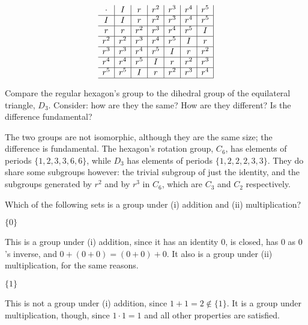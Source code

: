 \documentclass[../key.tex]{subfiles}
\begin{document}
$$\begin{array}{c|c|c|c|c|c|c|}
\cdot & I & r & r^2 & r^3 & r^4 & r^5 \\ \hline
I & I & r & r^2 & r^3 & r^4 & r^5 \\ \hline
r & r & r^2 & r^3 & r^4 & r^5 & I \\ \hline
r^2 & r^2 & r^3 & r^4 & r^5 & I & r \\ \hline
r^3 & r^3 & r^4 & r^5 & I & r & r^2 \\ \hline
r^4 & r^4 & r^5 & I & r & r^2 & r^3 \\ \hline
r^5 & r^5 & I & r & r^2 & r^3 & r^4 \\ \hline
\end{array}$$

\begin{inner_problem}
\item Compare the regular hexagon's group to the dihedral group of the equilateral triangle, $D_3$. Consider: how are they the same? How are they different? Is the difference fundamental?
\end{inner_problem}

The two groups are not isomorphic, although they are the same size; the difference is fundamental. The hexagon's rotation group, $C_6$, has elements of periods $\{1,2,3,3,6,6\}$, while $D_3$ has elements of periods $\{1,2,2,2,3,3\}$. They do share some subgroups however: the trivial subgroup of just the identity, and the subgroups generated by $r^2$ and by $r^3$ in $C_6$, which are $C_3$ and $C_2$ respectively.

\begin{outer_problem}
\item Which of the following sets is a group under (i) addition and (ii) multiplication?
\end{outer_problem}

\begin{inner_problem}[start=1]
\item $\{0\}$
\end{inner_problem}

This is a group under (i) addition, since it has an identity $0$, is closed, has $0$ as $0$'s inverse, and $0+(0+0)=(0+0)+0$. It also is a group under (ii) multiplication, for the same reasons.

\begin{inner_problem}
\item $\{1\}$
\end{inner_problem}

This is not a group under (i) addition, since $1+1=2\not\in \{1\}$. It is a group under multiplication, though, since $1\cdot 1 = 1$ and all other properties are satisfied.
\end{document}
